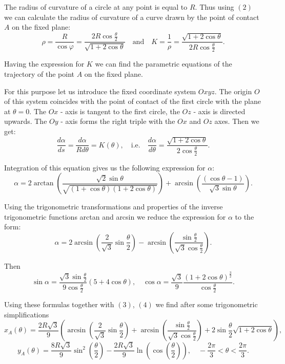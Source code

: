 \documentclass[10pt]{enoc2011}
\begin{document}
The radius of curvature of a circle at any point is equal to $R$. Thus using $(2)$ we can calculate the radius of curvature of a curve drawn by the point of contact $A$ on the fixed plane:
$$
\rho=\frac{R}{\cos\varphi}=\frac{2R\cos\frac{\theta}{2}}{\sqrt{1+2\cos\theta}}\quad\mbox{and}\quad
K=\frac{1}{\rho}=\frac{\sqrt{1+2\cos\theta}}{2R\cos\frac{\theta}{2}}.
$$

Having the expression for $K$ we can find the parametric equations of the trajectory of the point $A$ on the fixed plane.

For this purpose let us introduce the fixed coordinate system $Oxyz$. The origin $O$ of this system coincides with the point of contact of the first circle with the plane at $\theta=0$. The $Ox$ - axis is tangent to the first circle, the $Oz$ - axis is directed upwards. The $Oy$ - axis forms the right triple with the $Ox$ and $Oz$ axes. Then we get:
$$
\frac{d\alpha}{ds}=\frac{d\alpha}{Rd\theta}=K\left(\theta\right),\quad\mbox{i.e.}\quad \frac{d\alpha}{d\theta}=\frac{\sqrt{1+2\cos\theta}}{2\cos\frac{\theta}{2}}.
$$

Integration of this equation gives us the following expression for $\alpha$:
$$
\alpha=2\arctan\left(\frac{\sqrt{2}\sin\theta}{\sqrt{\left(1+\cos\theta\right)\left(1+2\cos\theta\right)}}\right)+
\arcsin\left(\frac{\left(\cos\theta-1\right)}{\sqrt{3}\sin\theta}\right).
$$

Using the trigonometric transformations and properties of the inverse trigonometric functions arctan and arcsin we reduce the expression for $\alpha$ to the form:
$$
\alpha=2\arcsin\left(\frac{2}{\sqrt{3}}\sin\frac{\theta}{2}\right)-\arcsin\left(\frac{\sin\frac{\theta}{2}}
{\sqrt{3}\cos\frac{\theta}{2}}\right).
$$

Then
$$
\sin\alpha=\frac{\sqrt{3}\sin\frac{\theta}{2}}{9\cos\frac{\theta}{2}}\left(5+4\cos\theta\right),\quad
\cos\alpha=\frac{\sqrt{3}}{9}\frac{\left(1+2\cos\theta\right)^{\frac{3}{2}}}
{\cos\frac{\theta}{2}}.
$$

Using these formulas together with $(3)$, $(4)$ we find after some trigonometric simplifications
$$
x_A\left(\theta\right)\!=\!\frac{2R\sqrt{3}}{9}\left(\arcsin\left(\frac{2}{\sqrt{3}}\sin\frac{\theta}{2}\right)\!+\!
\arcsin\left(\frac{\sin\frac{\theta}{2}}{\sqrt{3}\cos\frac{\theta}{2}}\right)\!+\!
2\sin\frac{\theta}{2}\sqrt{1\!+\!2\cos\theta}\right),
$$
$$
y_A\left(\theta\right)=\frac{8R\sqrt{3}}{9}\sin^2\left(\frac{\theta}{2}\right)-\frac{2R\sqrt{3}}{9}\ln\left(\cos\left(\frac{\theta}{2}\right)\right),
\quad -\frac{2\pi}{3}<\theta<\frac{2\pi}{3}.
$$
\end{document}
